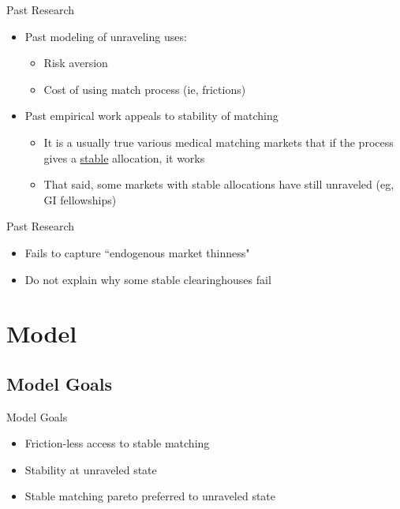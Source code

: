 \documentclass{beamer}
\begin{document}
\begin{frame}{Past Research}
\begin{itemize}
\item Past modeling of unraveling uses:
\begin{itemize}
    \item Risk aversion
    \item  Cost of using match process (ie, frictions)
\end{itemize}
\item Past empirical work appeals to stability of matching
\begin{itemize}
    \item It is a usually true various medical matching markets that if the process gives a  \hyperlink{definestable}{stable} \hypertarget{r_definestable}{allocation}, it works
    \item That said, some markets with stable allocations have still unraveled (eg, GI fellowships)
\end{itemize}
\end{itemize}
\end{frame}

\begin{frame}{Past Research}
\begin{itemize}
\item Fails to capture ``endogenous market thinness"
\item Do not explain why some stable clearinghouses fail
\end{itemize}


\end{frame}


\section{Model}
\subsection{Model Goals}

\begin{frame}{Model Goals}
\begin{itemize}
    \item Friction-less access to stable matching
    \item Stability at unraveled state
    \item Stable matching pareto preferred to unraveled state
\end{itemize}
\end{frame}
\end{document}
